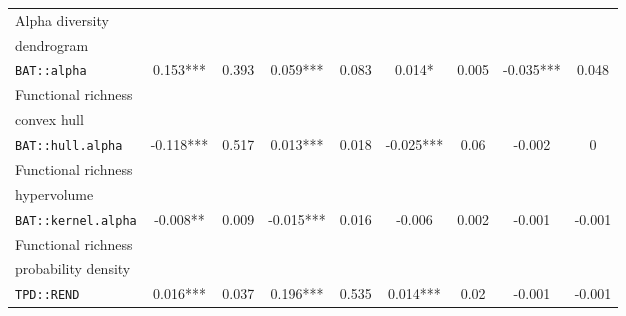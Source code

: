 \documentclass[12pt,letterpaper]{article}
\begin{document}
\begin{landscape}
\begin{table}
\begin{tabular}[t]{l|c|c|c|c|c|c|c|c}
\hline
Alpha diversity\\dendrogram\\ \texttt{BAT::alpha} & 0.153*** & 0.393 & 0.059*** & 0.083 & 0.014* & 0.005 & -0.035*** & 0.048\\
\hline
Functional richness\\convex hull\\ \texttt{BAT::hull.alpha} & -0.118*** & 0.517 & 0.013*** & 0.018 & -0.025*** & 0.06 & -0.002 & 0\\
\hline
Functional richness\\hypervolume\\ \texttt{BAT::kernel.alpha} & -0.008** & 0.009 & -0.015*** & 0.016 & -0.006 & 0.002 & -0.001 & -0.001\\
\hline
Functional richness\\probability density\\ \texttt{TPD::REND} & 0.016*** & 0.037 & 0.196*** & 0.535 & 0.014*** & 0.02 & -0.001 & -0.001\\
\hline
\end{tabular}
\end{table}
\end{landscape}
\end{document}
